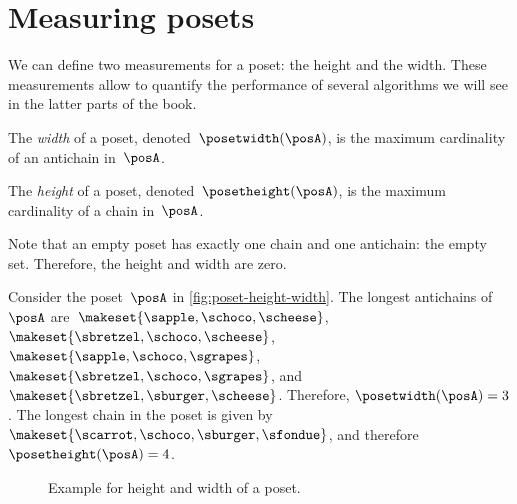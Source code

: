 
\section{Measuring posets}
We can define two measurements for a poset: the height and the width.
These measurements allow to quantify the performance of several algorithms we will see in the latter parts of the book.
\begin{definition}
    \label{def:poset-width}
    The \emph{width} of a poset, denoted~$\posetwidth(\posA)$, is the maximum cardinality of an antichain in~$\posA$.
\end{definition}

\begin{definition}
    \label{def:poset-height}
    The \emph{height} of a poset, denoted~$\posetheight(\posA)$, is the maximum cardinality of a chain in~$\posA$.
\end{definition}

Note that an empty poset has exactly one chain and one antichain: the empty set. Therefore, the height and width are zero.

\begin{example}
    Consider the poset~$\posA$ in \cref{fig:poset-height-width}.
    The longest antichains of~$\posA$ are~$\makeset{\sapple, \schoco, \scheese}$,~$\makeset{\sbretzel, \schoco, \scheese}$,~$\makeset{\sapple, \schoco, \sgrapes}$,~$\makeset{\sbretzel, \schoco, \sgrapes}$, and~$\makeset{\sbretzel, \sburger, \scheese}$.
    Therefore, $\posetwidth(\posA)=3$.
    The longest chain in the poset is given by~$\makeset{\scarrot,\schoco,\sburger,\sfondue}$, and therefore $\posetheight(\posA)=4$.
\end{example}

\begin{figure*}[h]
    \caption{Example for height and width of a poset.
    }
\end{figure*}

